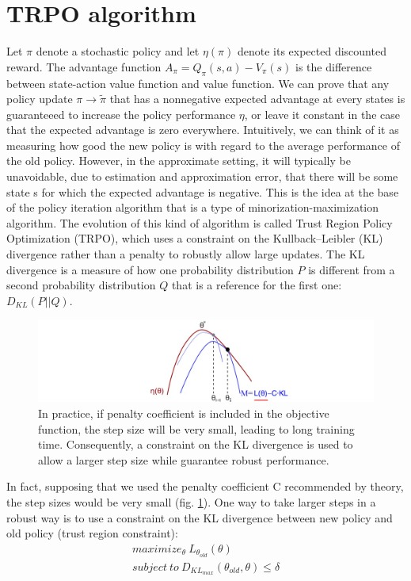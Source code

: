 \documentclass[11pt]{article}
\begin{document}
\section{TRPO algorithm}\label{section-trpo}
Let $\pi$ denote a stochastic policy and let $\eta(\pi)$ denote its expected discounted reward. The
advantage function $A_{\pi} = Q_{\pi}(s, a) - V_{\pi}(s)$ is the difference between state-action
value function and value function. We can prove that any policy update $\pi \rightarrow \tilde{\pi}$
that has a nonnegative expected advantage at every states is guaranteeed to increase the policy
performance $\eta$, or leave it constant in the case that the expected advantage is zero everywhere.
Intuitively, we can think of it as measuring how good the new policy is with regard to the average
performance of the old policy. However, in the approximate setting, it will typically be
unavoidable, due to estimation and approximation error, that there will be some state s for which
the expected advantage is negative. This is the idea at the base of the policy iteration algorithm
that is a type of minorization-maximization algorithm. The evolution of this kind of algorithm is
called Trust Region Policy Optimization (TRPO), which uses a constraint on the Kullback–Leibler (KL)
divergence rather than a penalty to robustly allow large updates. The KL divergence is a measure of
how one probability distribution $P$ is different from a second probability distribution $Q$ that is
a reference for the first one: $D_{KL}(P||Q)$.

\begin{figure}[t]
        \includegraphics[width=15cm]{functions}
        \centering
        \caption{In practice, if penalty coefficient is included in the objective function,
        the step size will be very small, leading to long training time.
        Consequently, a constraint on the KL divergence is used to allow a larger step size
        while guarantee robust performance.}
        \label{fig:functions}
\end{figure}

In fact, supposing that we used the penalty coefficient C recommended by theory, the step sizes
would be very small (fig. \ref{fig:functions}). One way to take larger steps in a robust way is to use a constraint
on the KL divergence between new policy and old policy (trust region constraint):
\begin{equation}
        \begin{split}
        maximize_{\theta} \ L_{\theta_{old}}(\theta)
        \\ \label{eq:1}
        subject \  to \ D_{KL_{max}}(\theta_{old}, \theta) \leq \delta
        \end{split}
\end{equation}
\end{document}
